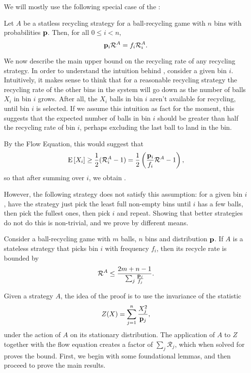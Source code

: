 We will mostly use the following special case of the
: 

\begin{lemma} \label{lem:flow-equation}
	Let $A$ be a statless recycling strategy for a ball-recycling game with $n$
	bins with probabilities $\mathbf{p}$.  Then, for all $0\leq i < n$,
	\begin{equation}
		\mathbf{p}_i\mathcal{R}^A = f_i\mathcal{R}_i^A.
	\end{equation}
\end{lemma}

We now describe the main upper bound on the recycling rate of any recycling
strategy. In order to understand the intuition behind ,
consider a given bin $i$. Intuitively, it makes sense to think that for a
reasonable recycling strategy the recycling rate of the other bins in the
system will go down as the number of balls $X_i$ in bin $i$ grows.  After all,
the $X_i$ balls in bin $i$ aren't available for recycling, until bin $i$ is
selected. If we assume this intuition as fact for the moment, this suggests
that the expected number of balls in bin $i$ should be greater than half the
recycling rate of bin $i$, perhaps excluding the last ball to land in the bin.

By the Flow Equation, this would suggest that
\[ \mathrm{E}\left[X_i\right] \geq \frac{1}{2}(\mathcal{R}_i^A - 1) =
\frac{1}{2}\left(\frac{\mathbf{p}_i}{f_i}\mathcal{R}^A - 1\right), \]
so that after summing over $i$, we obtain .

However, the following strategy does not satisfy this assumption: for a given
bin $i$, have the strategy just pick the least full non-empty bins until $i$
has a few balls, then pick the fullest ones, then pick $i$ and repeat. Showing
that better strategies do not do this is non-trivial, and we prove
 by different means.

\begin{lemma}\label{lem:freqbound}
	Consider a ball-recycling game with $m$ balls, $n$ bins and distribution
	$\mathbf{p}$. If $A$ is a stateless strategy that picks bin $i$ with frequency
	$f_i$, then its recycle rate is bounded by
	\begin{equation}
		\mathcal{R}^A \leq \frac{2m+n-1}{\sum_j\frac{\mathbf{p}_j}{f_j}}.
	\end{equation}
\end{lemma}

Given a strategy $A$, the idea of the proof is to use the invariance of the
statistic
\begin{equation}
	Z(X) = \sum_{j = 1}^n \frac{X_j^2}{\mathbf{p}_j},
\end{equation}
under the action of $A$ on its stationary distribution. The application of $A$
to $Z$ together with the flow equation creates a factor of $\sum_j
\mathcal{R}_j$, which when solved for proves the bound. First, we begin with
some foundational lemmas, and then proceed to prove the main results.

